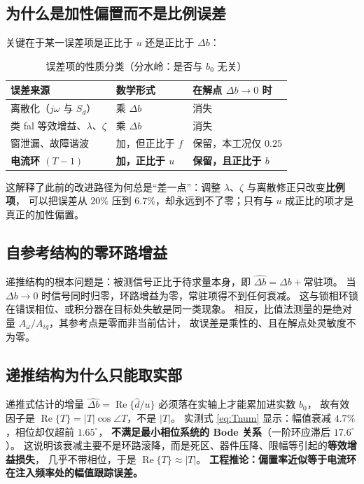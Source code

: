 \documentclass[11pt,a4paper]{ctexart}
\newcommand{\RE}{\operatorname{Re}}
\begin{document}
\subsection{为什么是加性偏置而不是比例误差}

关键在于某一误差项是正比于 $u$ 还是正比于 $\Delta b$：

\begin{table}[h]
\centering
\caption{误差项的性质分类（分水岭：是否与 $b_0$ 无关）}
\begin{tabular}{lll}
\toprule
误差来源 & 数学形式 & 在解点 $\Delta b\to0$ 时 \\
\midrule
离散化（$j\omega$ 与 $S_d$） & 乘 $\Delta b$ & 消失 \\
类 fal 等效增益、$\lambda$、$\zeta$ & 乘 $\Delta b$ & 消失 \\
窗泄漏、故障谐波 & 加，但正比于 $f$ & 保留，本工况仅 $0.25$ \\
\textbf{电流环 $(T-1)$} & \textbf{加，正比于 $u$} & \textbf{保留，且正比于 $b$} \\
\bottomrule
\end{tabular}
\end{table}

这解释了此前的改进路径为何总是“差一点”：调整 $\lambda$、$\zeta$ 与离散修正只改变\textbf{比例项}，
可以把误差从 $20\%$ 压到 $6.7\%$，却永远到不了零；只有与 $u$ 成正比的项才是真正的加性偏置。

\subsection{自参考结构的零环路增益}

递推结构的根本问题是：被测信号正比于待求量本身，即 $\widehat{\Delta b}=\Delta b+\text{常驻项}$。
当 $\Delta b\to0$ 时信号同时归零，环路增益为零，常驻项得不到任何衰减。
这与锁相环锁在错误相位、或积分器在目标处失敏是同一类现象。
相反，比值法测量的是绝对量 $A_\omega/A_{iq}$，其参考点是零而非当前估计，
故误差是乘性的、且在解点处灵敏度不为零。

\subsection{递推结构为什么只能取实部}
\label{sec:repart}

递推式估计的增量 $\widehat{\Delta b}=\RE\{\hat d/u\}$ 必须落在实轴上才能累加进实数 $b_0$，
故有效因子是
$\RE\{T\}=|T|\cos\angle T$，不是 $|T|$。
实测式 \eqref{eq:Tnum} 显示：幅值衰减 $4.7\%$，相位却仅超前 $1.65^{\circ}$，
\textbf{不满足最小相位系统的 Bode 关系}（一阶环应滞后 $17.6^{\circ}$）。
这说明该衰减主要不是环路滚降，而是死区、器件压降、限幅等引起的\textbf{等效增益损失}，
几乎不带相位，于是 $\RE\{T\}\approx|T|$。
\textbf{工程推论：偏置率近似等于电流环在注入频率处的幅值跟踪误差。}
\end{document}
